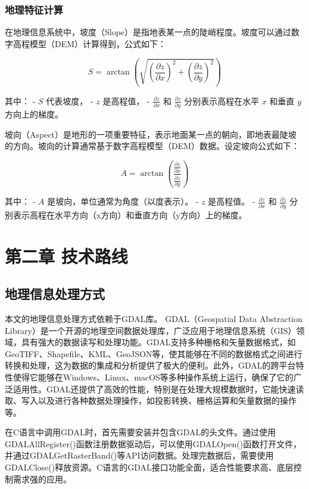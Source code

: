 \documentclass{article}
\begin{document}
		
		
		
		
		\subsubsection{地理特征计算}
		
		在地理信息系统中，坡度（Slope）是指地表某一点的陡峭程度。坡度可以通过数字高程模型（DEM）计算得到，公式如下：
		
		\[
		S = \arctan \left( \sqrt{ \left( \frac{\partial z}{\partial x} \right)^2 + \left( \frac{\partial z}{\partial y} \right)^2 } \right)
		\]
		
		其中：
		- \( S \) 代表坡度，
		- \( z \) 是高程值，
		- \( \frac{\partial z}{\partial x} \) 和 \( \frac{\partial z}{\partial y} \) 分别表示高程在水平 \( x \) 和垂直 \( y \) 方向上的梯度。

		
		坡向（Aspect）是地形的一项重要特征，表示地面某一点的朝向，即地表最陡坡的方向。坡向的计算通常基于数字高程模型（DEM）数据。设定坡向公式如下：
		
		\[
		A = \arctan \left( \frac{ \frac{\partial z}{\partial x} }{ \frac{\partial z}{\partial y} } \right)
		\]
		
		其中：
		- \( A \) 是坡向，单位通常为角度（以度表示）。
		- \( z \) 是高程值。
		- \( \frac{\partial z}{\partial x} \) 和 \( \frac{\partial z}{\partial y} \) 分别表示高程在水平方向（x方向）和垂直方向（y方向）上的梯度。
		
		
	\section{第二章 技术路线}
	
	
	\subsection{地理信息处理方式}

	本文的地理信息处理方式依赖于GDAL库。
	GDAL（Geospatial Data Abstraction Library）是一个开源的地理空间数据处理库，广泛应用于地理信息系统（GIS）领域，具有强大的数据读写和处理功能。GDAL支持多种栅格和矢量数据格式，如GeoTIFF、Shapefile、KML、GeoJSON等，使其能够在不同的数据格式之间进行转换和处理，这为数据的集成和分析提供了极大的便利。此外，GDAL的跨平台特性使得它能够在Windows、Linux、macOS等多种操作系统上运行，确保了它的广泛适用性。GDAL还提供了高效的性能，特别是在处理大规模数据时，它能快速读取、写入以及进行各种数据处理操作，如投影转换、栅格运算和矢量数据的操作等。
	
	在C语言中调用GDAL时，首先需要安装并包含GDAL的头文件。通过使用GDALAllRegister()函数注册数据驱动后，可以使用GDALOpen()函数打开文件，并通过GDALGetRasterBand()等API访问数据。处理完数据后，需要使用GDALClose()释放资源。C语言的GDAL接口功能全面，适合性能要求高、底层控制需求强的应用。
	
\end{document}
